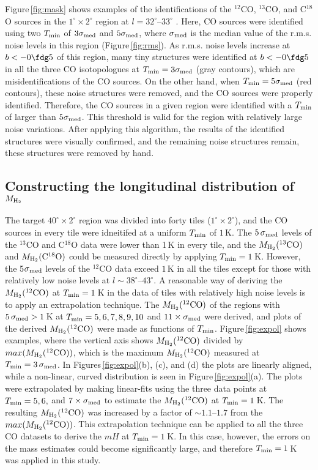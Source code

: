 \documentclass[proof]{pasj01}
\newcommand{\mH}{M_{\rm H_2}}
\newcommand{\mtwo}{M_{\rm H_2}{\rm (^{12}CO)}}
\newcommand{\mthree}{M_{\rm H_2}{\rm (^{13}CO)}}
\newcommand{\meight}{M_{\rm H_2}{\rm (C^{18}O)}}
\begin{document}
Figure\,\ref{fig:mask} shows examples of the identifications of the $^{12}$CO, $^{13}$CO, and C$^{18}$O sources in the $1^\circ \times 2^\circ$ region at $l=32^\circ$--$33^\circ$ .
Here, CO sources were identified using two $T_{\rm min}$ of $3\sigma_{\rm med}$ and $5\sigma_{\rm med}$, where $\sigma_{\rm med}$ is the median value of the r.m.s. noise levels in this region (Figure\,\ref{fig:rms}).
As r.m.s. noise levels increase at $b<-0\fdg5$ of this region, many tiny structures were identified at $b<-0\fdg5$ in all the three CO isotopologues at $T_{\rm min} = 3\sigma_{\rm med}$ (gray contours), which are misidentifications of the CO sources.
On the other hand, when $T_{\rm min} = 5\sigma_{\rm med}$ (red contours), these noise structures were removed, and the CO sources were properly identified.
Therefore, the CO sources in a given region were identified with a $T_{\rm min}$ of larger than $5\sigma_{\rm med}$.
This threshold is valid for the region with relatively large noise variations.
After applying this algorithm, the results of the identified structures were visually confirmed, and the remaining noise structures remain, these structures were removed by hand.

\subsection{Constructing the longitudinal distribution of $\mH$}
The target $40^\circ \times 2^\circ$ region was divided into forty tiles ($1^\circ \times 2^\circ$), and the CO sources in every tile were idneitifed at a uniform $T_{\rm min}$ of $1$\,K.
The $5\,\sigma_{\rm med}$ levels of the $^{13}$CO and C$^{18}$O data were lower than 1\,K in every tile, and the $\mthree$ and $\meight$ could be measured directly by applying $T_{\rm min} = 1$\,K.
However, the 5$\sigma_{\rm med}$ levels of the $^{12}$CO data exceed $1$\,K in all the tiles except for those with relatively low noise levels at $l\sim38^\circ$--$43^\circ$.
A reasonable way of deriving the $\mtwo$ at $T_{\rm min} = 1$\,K in the data of tiles with relatively high noise levels is to apply an extrapolation technique.
The $\mtwo$ of the regions with $5\,\sigma_{\rm med} > 1$\,K at $T_{\rm min} = 5, 6, 7, 8, 9, 10$ and $11\times\sigma_{\rm med}$ were derived, and plots of the derived $\mtwo$ were made as functions of $T_{\rm min}$.
Figure\,\ref{fig:expol} shows examples, where the vertical axis shows $\mtwo$ divided by $max(M_{\rm H_2}{\rm (^{12}CO)})$, which is the maximum $\mtwo$ measured at $T_{\rm min} = 3\,\sigma_{\rm med}$.
In Figures\,\ref{fig:expol}(b), (c), and (d) the plots are linearly aligned, while a non-linear, curved distribution is seen in Figure\,\ref{fig:expol}(a).
The plots were extrapolated by making linear-fits using the three data points at $T_{\rm min} = 5, 6,$ and $7\times\sigma_{\rm med}$ to estimate the $\mtwo$ at $T_{\rm min} = 1$\,K.
The resulting $\mtwo$ was increased by a factor of $\sim1.1$--$1.7$ from the $max(M_{\rm H_2}{\rm (^{12}CO))}$.
This extrapolation technique can be applied to all the three CO datasets to derive the $mH$ at $T_{\rm min} = 1$\,K.
In this case, however, the errors on the mass estimates could become significantly large, and therefore $T_{\rm min} = 1\,$K was applied in this study.
\end{document}

